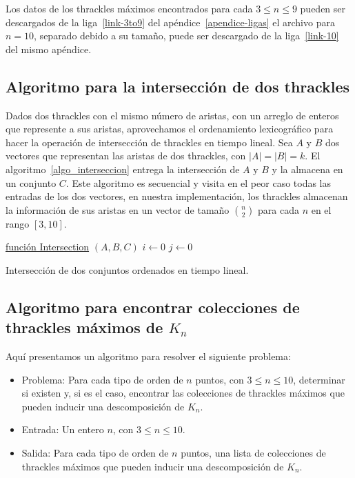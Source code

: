 
  Los datos de los thrackles máximos encontrados para cada $ 3\leq n \leq 9$
  pueden ser descargados de la liga~\ref{link-3to9} del apéndice~\ref{apendice-ligas}
  el archivo para $n=10$, separado debido a su tamaño, puede ser descargado de la liga~\ref{link-10} del
  mismo apéndice.

\subsection{Algoritmo para la intersección de dos thrackles}\label{secc:algo_interseccion_thrackles}
  Dados dos thrackles con el mismo número de aristas, con un arreglo de enteros que
  represente a sus aristas, aprovechamos el ordenamiento lexicográfico para hacer la
  operación de intersección de thrackles en tiempo lineal.
  Sea $A$ y $B$ dos vectores que representan las aristas de dos thrackles, con
  $|A|=|B|=k$. El algoritmo~\ref{algo_interseccion} entrega la intersección de $A$ y $B$
  y la almacena en un conjunto $C$. Este algoritmo es secuencial y visita en el peor caso
  todas las entradas de los dos vectores, en nuestra implementación, los thrackles
  almacenan la información de sus aristas en un vector de tamaño $\binom{n}{2}$ para cada
  $n$ en el rango $[3,10]$.
  \begin{algorithm}[]
    \DontPrintSemicolon
    \underline{función Intersection} $(A,B,C)$\;
      $i\gets 0$\;
      $j\gets 0$\;
    \caption{Intersección de dos conjuntos ordenados en tiempo
    lineal.}
    \label{algo_interseccion}
  \end{algorithm}

\subsection{Algoritmo para encontrar colecciones de thrackles máximos de $K_n$} \label{secc:algo_descomposicion_thrackles_maximos}
  Aquí presentamos un algoritmo para resolver el siguiente problema:
  \begin{itemize}
    \item[] Problema: Para cada tipo de orden de $n$ puntos, con $3 \leq n \leq 10$, determinar si existen y, si es el caso, encontrar las colecciones de thrackles máximos que pueden inducir una descomposición de $K_n$.
    \item[] Entrada: Un entero $n$, con $ 3 \leq n \leq 10$.
    \item[] Salida: Para cada tipo de orden de $n$ puntos, una lista de colecciones de thrackles máximos que pueden inducir una descomposición de $K_n$.
  \end{itemize}

